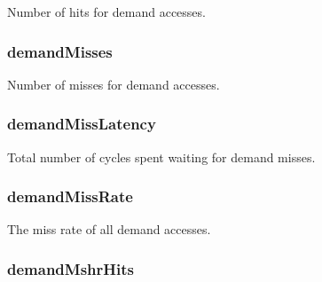 \label{group__CacheStatistics_gafc2d55cfff6a5b55a9c19bf5c7b13729}
Number of hits for demand accesses. \hypertarget{group__CacheStatistics_gab0c200c0250a66f1e1d8a257d3f9f313}{
\subsubsection[{demandMisses}]{ demandMisses}}
\label{group__CacheStatistics_gab0c200c0250a66f1e1d8a257d3f9f313}
Number of misses for demand accesses. \hypertarget{group__CacheStatistics_gaef1ab5073e901bd4df644ff0780fc668}{
\subsubsection[{demandMissLatency}]{ demandMissLatency}}
\label{group__CacheStatistics_gaef1ab5073e901bd4df644ff0780fc668}
Total number of cycles spent waiting for demand misses. \hypertarget{group__CacheStatistics_ga58de8cb7b3151d13ca30115eee7cd475}{
\subsubsection[{demandMissRate}]{ demandMissRate}}
\label{group__CacheStatistics_ga58de8cb7b3151d13ca30115eee7cd475}
The miss rate of all demand accesses. \hypertarget{group__CacheStatistics_gaf118fca77a3f5d6f217fcee58c71fec2}{
\subsubsection[{demandMshrHits}]{ demandMshrHits}}
